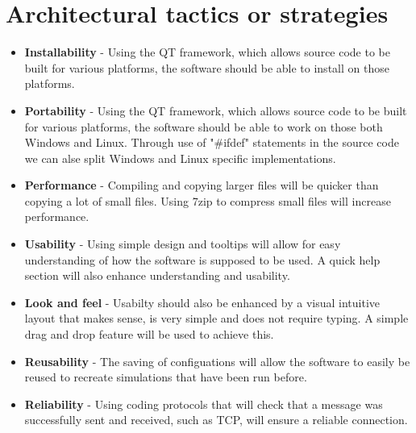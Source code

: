 \documentclass[a4paper,12pt,final]{article}
\begin{document}
\section{Architectural tactics or strategies}
\begin{itemize}
\item \textbf{Installability} - Using the QT framework, which allows source code to be built for various platforms, the software should be able to install on those platforms.
\item \textbf{Portability} - Using the QT framework, which allows source code to be built for various platforms, the software should be able to work on those both Windows and Linux. Through use of "\#ifdef" statements in the source code we can alse split Windows and Linux specific implementations.
\item \textbf{Performance} - Compiling and copying larger files will be quicker than copying a lot of small files. Using 7zip to compress small files will increase performance.
\item \textbf{Usability} - Using simple design and tooltips will allow for easy understanding of how the software is supposed to be used. A quick help section will also enhance understanding and usability.
\item \textbf{Look and feel} - Usabilty should also be enhanced by a visual intuitive layout that makes sense, is very simple and does not require typing. A simple drag and drop feature will be used to achieve this.
\item \textbf{Reusability} - The saving of configuations will allow the software to easily be reused to recreate simulations that have been run before.
\item \textbf{Reliability} - Using coding protocols that will check that a message was successfully sent and received, such as TCP, will ensure a reliable connection.
\end{itemize}
\end{document}
